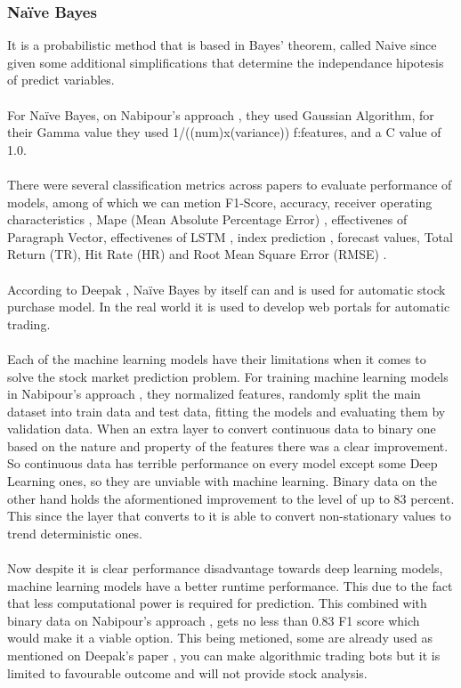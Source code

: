 \documentclass[conference]{IEEEtran}
\begin{document}
\subsubsection{Naïve Bayes}
It is a probabilistic method that is based in Bayes' theorem, called Naive since given some additional simplifications that determine
the independance hipotesis of predict variables.
\\\\
For Naïve Bayes, on Nabipour's approach \cite{nabipour2020predicting}, they used Gaussian Algorithm, for their Gamma value they used 1/((num)x(variance)) f:features, and a C value of 1.0.
\\\\
There were several classification metrics across papers to evaluate performance of models,
among of which we can metion F1-Score, accuracy, receiver operating characteristics \cite{nabipour2020predicting},
Mape (Mean Absolute Percentage Error) \cite{M2018}, effectivenes of Paragraph Vector, effectivenes of LSTM \cite{Akita2016}, index prediction \cite{Vargas2017},
forecast values, Total Return (TR), Hit Rate (HR) and Root Mean Square Error (RMSE) \cite{Singh2016}.
\\\\
According to Deepak \cite{deepak2017machine}, Naïve Bayes by itself can and is used for automatic stock purchase model. In the real world it is used to develop web portals for automatic trading.
\\\\
Each of the machine learning models have their limitations when it comes to solve the stock market prediction problem.
For training machine learning models in Nabipour's approach \cite{nabipour2020predicting}, they normalized features, randomly split 
the main dataset into train data and test data, fitting the models and evaluating them by validation data. When an extra layer to convert continuous data to binary
one based on the nature and property of the features there was a clear improvement. So continuous data has terrible performance on every model except some Deep Learning ones, so they are unviable with machine learning. Binary data on the other hand holds the aformentioned
improvement to the level of up to 83 percent. This since the layer that converts to it is able to convert non-stationary values to trend deterministic ones.
\\\\
Now despite it is clear performance disadvantage towards deep learning models, machine learning models have a better runtime performance. This due to the fact
that less computational power is required for prediction. This combined with binary data on Nabipour's approach \cite{nabipour2020predicting}, gets no less than 0.83 F1 score which would make it
a viable option. This being metioned, some are already used as mentioned on Deepak's paper \cite{deepak2017machine}, you can make algorithmic trading bots but it is limited to favourable outcome and will not provide stock analysis.
\end{document}
